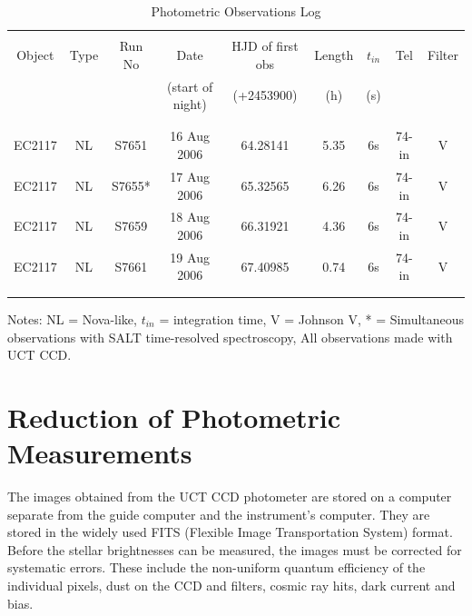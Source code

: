 \begin{table}
\begin{scriptsize}
\centering
\begin{tabular}{ccccccccc}
\hline\hline\\Object & Type & Run No & Date            & HJD of first obs & Length & $t_{in}$ & Tel & Filter \\ 
                     &      &        &(start of night) &     (+2453900)   &    (h)   & (s) &       & \\\\ \hline  \\
	EC2117       & NL   & S7651  & 16 Aug 2006     &    64.28141      &  5.35    & 6s  & 74-in & V \\ 
	EC2117       & NL   & S7655* & 17 Aug 2006     &    65.32565      &  6.26    & 6s  & 74-in & V \\  
        EC2117       & NL   & S7659  & 18 Aug 2006     &    66.31921      &  4.36    & 6s  & 74-in & V \\ 
        EC2117       & NL   & S7661  & 19 Aug 2006     &    67.40985      &  0.74    & 6s  & 74-in & V \\\\ \hline \\

\end{tabular}
Notes: NL = Nova-like, $t_{in}$ = integration time, V = Johnson V, * = Simultaneous observations with SALT time-resolved spectroscopy, All observations made with UCT CCD.
\end{scriptsize}
\caption[Photometric Observations Log]{Photometric Observations Log}
\label{obslog}
\end{table}





\section{Reduction of Photometric Measurements}

\label{phot_reductions}

The images obtained from the UCT CCD photometer are stored on a computer separate from the guide computer and the instrument's computer. They are stored in the widely used FITS (Flexible Image Transportation System) format. Before the stellar brightnesses can be measured, the images must be corrected for systematic errors. These include the non-uniform quantum efficiency of the individual pixels, dust on the CCD and filters, cosmic ray hits, dark current and bias.

